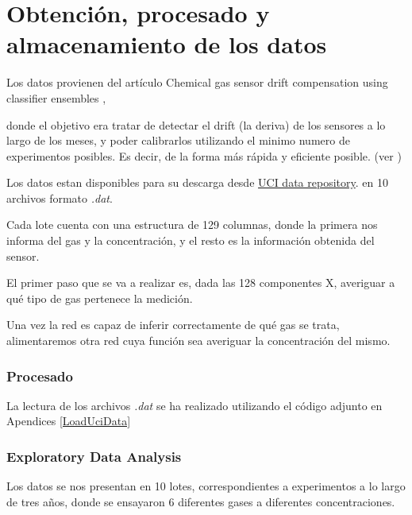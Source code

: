 \chapter{Obtención, procesado y almacenamiento de los datos}


Los datos provienen del artículo  Chemical gas sensor drift compensation using classifier ensembles \cite{GasData},

donde el objetivo era tratar de detectar el drift (la deriva) de los sensores a lo largo de los meses, y poder calibrarlos
utilizando el minimo numero de experimentos posibles. Es decir, de la forma más rápida y eficiente posible.
(ver \cite{GasData})

Los datos estan disponibles para su descarga desde
\href{https://archive.ics.uci.edu/ml//datasets/Gas+Sensor+Array+Drift+Dataset#}{UCI data repository}.
en 10 archivos formato \emph{.dat}.

Cada lote cuenta con una estructura de 129 columnas, donde la primera nos informa del gas y la concentración,
y el resto es la información obtenida del sensor.

El primer paso que se va a realizar es, dada las 128 componentes X,
averiguar a qué tipo de gas pertenece la medición.

Una vez la red es capaz de inferir correctamente de qué gas se trata,
alimentaremos otra red cuya función
sea averiguar la concentración del mismo.

\subsection{Procesado}

La lectura de los archivos  \emph{.dat} se ha realizado utilizando
el código adjunto en Apendices  \ref{LoadUciData}


\subsection{Exploratory Data Analysis}

Los datos se nos presentan en 10 lotes, correspondientes a experimentos a lo largo de tres años, donde se ensayaron
6 diferentes gases a diferentes concentraciones.

